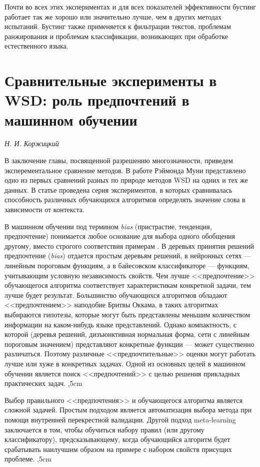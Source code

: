 \documentclass{article}
\begin{document}
\begin{articletext}
Почти во всех этих экспериментах и для всех показателей эффективности бустинг работает так же хорошо или значительно лучше, чем в других методах испытаний. Бустинг также применяется к фильтрации текстов, проблемам ранжирования и проблемам классификации, возникающих при обработке естественного языка.

\section{Сравнительные эксперименты в WSD: роль предпочтений в машинном обучении}

\begin{flushright}
\textit{Н. И. Коржицкий}
\end{flushright}

В заключение главы, посвященной разрешению многозначности, приведем эксперементальное сравнение методов. В работе Рэймонда Муни \cite{Mooney 1996} представлено одно из первых сравнений разных по природе методов WSD на одних и тех же данных. В статье \cite{Mooney 1996} проведена серия экспериментов, в которых сравнивалась способность различных обучающихся алгоритмов определять значение слова в зависимости от контекста. 

В машинном обучении под термином \textit{bias} (пристрастие, тенденция, предпочтение)  понимается любое основание для выбора одного обобщения другому, вместо строгого соответствия примерам \cite{Mooney 1996}. В деревьях принятия решений предпочтение (\textit{bias}) отдается простым деревьям решений, в нейронных сетях --- линейным пороговым функциям, а в байесовском классификаторе --- функциям, учитывающим условную независимость свойств. Чем лучше <<предпочтение>> обучающегося алгоритма соответствует характеристикам конкретной задачи, тем лучше будет результат. Большинство обучающихся алгоритмов обладают <<предпочтением>> наподобие Бритвы Оккама, в таких алгоритмах выбираются гипотезы, которые могут быть представлены меньшим количеством информации на каком-нибудь языке представлений. Однако компактность, с которой (деревья решений, дизъюнктивная нормальная форма, сети с линейным пороговым значением) представляют конкретные функции --- может существенно различаться. Поэтому различные <<предпочтительные>> оценки могут работать лучше или хуже в конкретных задачах. Одной из основных целей в машинном обучении является поиск <<предпочтений>> с целью решения прикладных практических задач.
,5cm

Выбор правильного <<предпочтения>> и обучающегося алгоритма является сложной задачей. Простым подходом является автоматизация выбора метода при помощи внутренней перекрестной валидации. Другой подход meta-learning заключается в том, чтобы обучиться набору правил (или другому классификатору), предсказывающему, когда обучающийся алгоритм будет срабатывать наилучшим образом на примере с набором свойств присущих проблеме.
,5cm


\end{articletext}
\end{document}
